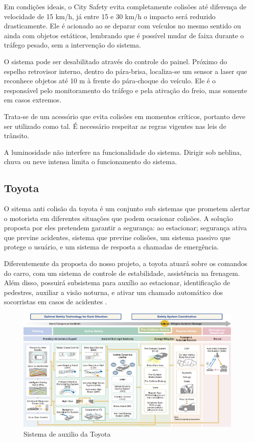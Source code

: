 Em condições ideais, o City Safety evita completamente colisões até diferença de velocidade de 15 km/h, já entre 15 e 30 km/h o impacto será reduzido drasticamente. Ele é acionado ao se deparar com veículos no mesmo sentido ou ainda com objetos estáticos, lembrando que é possível mudar de faixa durante o tráfego pesado, sem a intervenção do sistema.

O sistema pode ser desabilitado através do controle do painel. Próximo do espelho retrovisor interno, dentro do pára-brisa, localiza-se um sensor a laser que reconhece objetos até 10 m à frente do pára-choque do veículo. Ele é o responsável pelo monitoramento do tráfego e pela ativação do freio, mas somente em casos extremos.

Trata-se de um acessório que evita colisões em momentos críticos, portanto deve ser utilizado como tal. É necessário respeitar as regras vigentes nas leis de trânsito.

A luminosidade não interfere na funcionalidade do sistema. Dirigir sob neblina, chuva ou neve intensa limita o funcionamento do sistema.

\subsection{Toyota}
O sitema anti colisão da toyota é um conjunto sub sistemas que prometem alertar o motorista em diferentes situações que podem ocasionar colisões. A solução proposta por eles pretendem garantir a segurança: ao estacionar; segurança ativa que previne acidentes, sistema que previne colisões, um sistema passivo que protege o usuário, e um sistema de resposta a chamadas de emergência.

Diferentemente da proposta do nosso projeto, a toyota atuará sobre os comandos do carro, com um sistema de controle de estabilidade, assistência na frenagem. Além disso, possuirá subsistema para auxílio ao estacionar, identificação de pedestres, auxiliar a visão noturna, e ativar um chamado automático dos socorristas em casos de acidentes \cite{toyota}.

\begin{figure}[h]
  \centering
  \includegraphics[width=450px, scale=0.5]{figuras/sistematoyota}
  \caption{Sistema de auxilio da Toyota}
  \label{fig:sistematoyota}
\end{figure}

